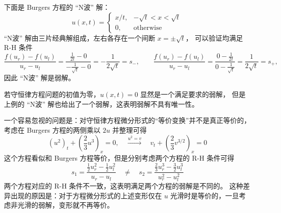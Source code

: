 \begin{example}
    下面是 Burgers 方程的 “N波” 解：
    \[
        u(x,t) =
        \begin{cases}
            x/t, & -\sqrt{t} < x < \sqrt{t} \\
            0,   & \text{otherwise}
        \end{cases}
    \]
    “N波” 解由三片经典解组成，左右各存在一个间断 $x = \pm \sqrt{t}$，
    可以验证均满足 R-H 条件
    \[
        \frac{f(u_r) - f(u_l)}{u_r - u_l} =
        \frac{\frac{1}{2t} - 0}{- \frac{1}{\sqrt{t}} - 0} = -\frac{1}{2\sqrt{t}} = s_-,
        \qquad
        \frac{f(u_r) - f(u_l)}{u_r - u_l} =
        \frac{0 - \frac{1}{2t}}{0 - \frac{1}{\sqrt{t}}} = \frac{1}{2\sqrt{t}} = s_+,
    \]
    因此 “N波” 解是弱解。
\end{example}

\begin{remark*}
    若守恒律方程问题的初值为零，$u(x,t) = 0$ 显然是一个满足要求的弱解，
    但是上例的 “N波” 解也给出了一个弱解，这表明弱解不具有唯一性。
\end{remark*}

一个容易忽视的问题是：对守恒律方程微分形式的“等价变换”并不是真正等价的，考虑在 Burgers 方程的两侧乘以 $2u$ 并整理可得
\[
    (u^2)_t + \left(\frac{2}3 u^3\right)_x = 0, \quad
    \xrightarrow{u^2 = v} \quad
    v_t + \left(\frac{2}3 v^{3/2}\right)_x = 0
\]
这个方程看似和 Burgers 方程等价，但是分别考虑两个方程的 R-H 条件可得
\[
    s_1 = \frac{\frac12 u_r^2 - \frac12 u_l^2}{u_r - u_l}
    \quad \neq \quad
    s_2 = \frac{\frac23 u_r^3 - \frac32 u_l^3}{u_r^2 - u_l^2}
\]
两个方程对应的 R-H 条件不一致，这表明满足两个方程的弱解是不同的。
这种差异出现的原因是：对于方程微分形式的上述变形仅在 $u$ 光滑时是等价的，一旦考虑非光滑的弱解，变形就不再等价。


